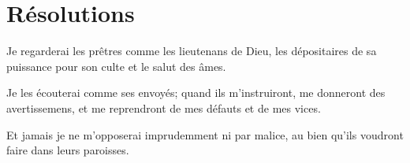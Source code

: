 \documentclass[instructions.tex]{subfiles}
\begin{document}
\section{Résolutions}
 
\primo Je regarderai les prêtres comme les lieutenans de Dieu, les dépositaires de sa puissance pour son culte et le salut des âmes.
 
\secundo Je les écouterai comme ses envoyés; quand ils m'instruiront, me donneront des avertissemens, et me reprendront de mes défauts et de mes vices.
 
\tertio Et jamais je ne m'opposerai imprudemment ni par malice, au bien qu'ils voudront faire dans leurs paroisses.

 
\end{document}
